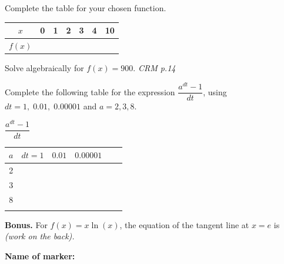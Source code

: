 \documentclass[9pt]{exam}
\begin{document}
\begin{questions}
\begin{minipage}[t]{0.5\textwidth}
Complete the table for your chosen function.

\vspace{4mm}

{\Large
\renewcommand{\arraystretch}{1.2}
\begin{tabular}{c|cccccc}
$x$ & 0 & 1 & 2 & 3 & 4 & 10 \\ \hline
$f(x)$ & & & & & & 
\end{tabular}
}

\end{minipage}
\hfill
\begin{minipage}[t]{0.5\textwidth}

Solve algebraically for $f(x) = 900$. \hfill \emph{CRM p.14}
\fillwithdottedlines{21mm}

\end{minipage}

\question[2] Complete the following table for the expression $\dfrac{a^{dt} - 1}{dt}$,
using $dt = 1,\; 0.01,\; 0.00001$ and $a = 2, 3, 8$.

\begin{center} \Large
$\displaystyle \dfrac{a^{dt} - 1}{dt} \qquad $
\renewcommand{\arraystretch}{1.2}
\begin{tabular}{c|cccc|c}
$a$ & $dt=1$ & $0.01$ & $0.00001$ & & \hspace{30mm} \\ \hline
2 &  &  &  &  & \\ \hline
3 &  &  &  &  & \\ \hline
8 &  &  &  &  & \\ \hline
 &  &  &  &  &
\end{tabular}
\end{center}


\vfill

\question[0] \textbf{Bonus.} For $f(x) = x \ln (x)$, the equation of the tangent line at $x = e$ is \dotfill \emph{\footnotesize(work on the back).}

\end{questions}


\begin{tcolorbox}
\textbf{Name of marker:}

\begin{center}
\gradetable[h][questions]
\end{center}

\end{tcolorbox}
\end{document}
